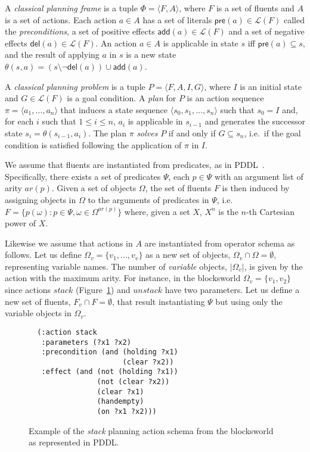 \documentclass[letterpaper]{article} %
\newcommand{\tup}[1]{{\langle #1 \rangle}}
\newcommand{\pre}{\mathsf{pre}}     %
\newcommand{\del}{\mathsf{del}}     %
\newcommand{\add}{\mathsf{add}}     %
\begin{document}
A {\em classical planning frame} is a tuple $\Phi=\tup{F,A}$, where $F$ is a set of fluents and $A$ is a set of actions. Each action $a\in A$ has a set of literals $\pre(a)\in\mathcal{L}(F)$ called the {\em preconditions}, a set of positive effects $\add(a)\in\mathcal{L}(F)$ and a set of negative effects $\del(a)\in\mathcal{L}(F)$. An action $a\in A$ is applicable in state $s$ iff $\pre(a)\subseteq s$, and the result of applying $a$ in $s$ is a new state $\theta(s,a)=(s\setminus \neg\del(a))\cup\add(a)$.

A {\em classical planning problem} is a tuple $P=\tup{F,A,I,G}$, where $I$ is an initial state and $G\in\mathcal{L}(F)$ is a goal condition. A {\em plan} for $P$ is an action sequence $\pi=\tup{a_1, \ldots, a_n}$ that induces a state sequence $\tup{s_0, s_1, \ldots, s_n}$ such that $s_0=I$ and, for each $i$ such that {\small $1\leq i\leq n$}, $a_i$ is applicable in $s_{i-1}$ and generates the successor state $s_i=\theta(s_{i-1},a_i)$. The plan $\pi$ {\em solves} $P$ if and only if $G\subseteq s_n$, i.e.~if the goal condition is satisfied following the application of $\pi$ in $I$.

We assume that fluents are instantiated from predicates, as in PDDL~\cite{fox2003pddl2}. Specifically, there exists a set of predicates $\Psi$, each $p\in\Psi$ with an argument list of arity $ar(p)$. Given a set of objects $\Omega$, the set of fluents $F$ is then induced by assigning objects in $\Omega$ to the arguments of predicates in $\Psi$, i.e.~$F=\{p(\omega):p\in\Psi,\omega\in\Omega^{ar(p)}\}$ where, given a set $X$, $X^n$ is the $n$-th Cartesian power of $X$.

Likewise we assume that actions in $A$ are instantiated from operator schema as follows. Let us define $\Omega_v=\{v_1,\ldots,v_v\}$ as a new set of objects, $\Omega_v\cap\Omega=\emptyset$, representing variable names. The number of {\em variable} objects, $|\Omega_v|$, is given by the action with the maximum arity. For instance, in the blocksworld $\Omega_v=\{v_1,v_2\}$ since actions $stack$ (Figure~\ref{fig:stack}) and $unstack$ have two parameters. Let us define a new set of fluents, $F_{v}\cap F=\emptyset$, that result instantiating $\Psi$ but using only the variable objects in $\Omega_v$.

\begin{figure}[hbt]
\begin{footnotesize}
\begin{verbatim}
  (:action stack
   :parameters (?x1 ?x2)
   :precondition (and (holding ?x1) 
                      (clear ?x2))
   :effect (and (not (holding ?x1))
                (not (clear ?x2))
                (clear ?x1)
                (handempty)
                (on ?x1 ?x2)))
\end{verbatim}
\end{footnotesize}
 \caption{\small Example of the {\em stack} planning action schema from the blocksworld as represented in PDDL.}
\label{fig:stack}
\end{figure}
\end{document}

